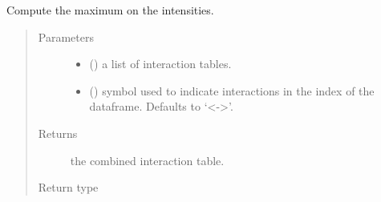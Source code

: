 \documentclass[letterpaper,10pt,english]{sphinxmanual}
\begin{document}
\begin{fulllineitems}
\label{\detokenize{_modules/cosifer.combiners:cosifer.combiners.cit.max_table}}
Compute the maximum on the intensities.
\begin{quote}\begin{description}
\item[{Parameters}] \leavevmode\begin{itemize}
\item {} 
 () \textendash{} a list of interaction tables.

\item {} 
 (\sphinxstyleliteralemphasis{\sphinxupquote{, }}) \textendash{} symbol used to indicate
interactions in the index of the dataframe. Defaults to ‘\textless{}-\textgreater{}’.

\end{itemize}

\item[{Returns}] \leavevmode
the combined interaction table.

\item[{Return type}] \leavevmode
{\hyperref[\detokenize{_modules/cosifer.collections:cosifer.collections.interaction_table.InteractionTable}]{}}

\end{description}\end{quote}

\end{fulllineitems}

\end{document}
